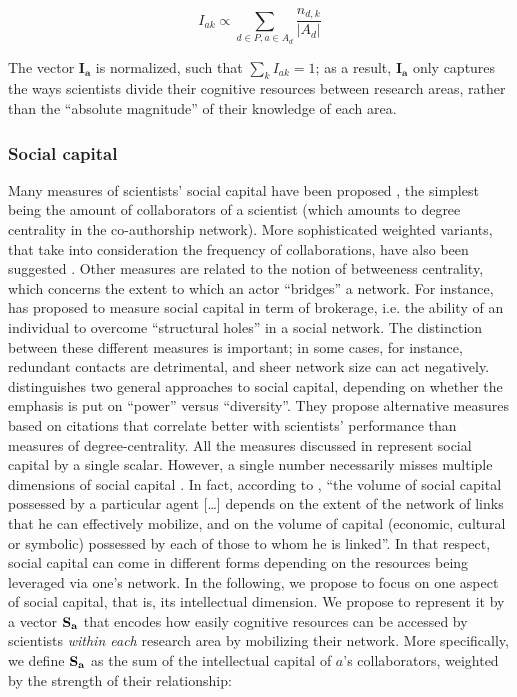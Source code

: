 \documentclass{article}
\begin{document}
\begin{equation}
    I_{ak} \propto  \sum_{d\in P,a\in A_d} \dfrac{n_{d,k}}{|A_d|}
\end{equation}

The vector $\bm{I_a}$ is normalized, such that $\sum_k I_{ak}=1$; as a result, $\bm{I_a}$ only captures the ways scientists divide their cognitive resources between research areas, rather than the ``absolute magnitude'' of their knowledge of each area.  

\subsubsection{Social capital}

Many measures of scientists' social capital have been proposed \citep{Abbasi2014,Schirone2023}, the simplest being the amount of collaborators of a scientist (which amounts to degree centrality in the co-authorship network). More sophisticated weighted variants, that take into consideration the frequency of collaborations, have also been suggested \citep{Abbasi2014}. Other measures are related to the notion of betweeness centrality, which concerns the extent to which an actor ``bridges'' a network. For instance, \citet{BurtBrokerage2007} has proposed to measure social capital in term of brokerage, i.e. the ability of an individual to overcome ``structural holes'' in a social network. The distinction between these different measures is important; in some cases, for instance, redundant contacts are detrimental, and sheer network size can act negatively. \citet{Abbasi2014} distinguishes two general approaches to social capital, depending on whether the emphasis is put on ``power'' versus ``diversity''. They propose alternative measures based on citations that correlate better with scientists' performance than measures of degree-centrality. All the measures discussed in \citealt{Abbasi2014} represent social capital by a single scalar. However, a single number necessarily misses multiple dimensions of social capital \citep{MartnAlczar2019}. In fact, according to \citet{Bourdieu1980}, ``the volume of social capital possessed by a particular agent [\dots] depends on the extent of the network of links that he can effectively mobilize, and on the volume of capital (economic, cultural or symbolic) possessed by each of those to whom he is linked''. In that respect, social capital can come in different forms depending on the resources being leveraged via one's network. %
In the following, we propose to focus on one aspect of social capital, that is, its intellectual dimension. We propose to represent it by a vector $\bf{S}_{a}$ that encodes how easily cognitive resources can be accessed by scientists \textit{within each} research area by mobilizing their network. %
More specifically, we define $\bf{S}_{a}$ as the sum of the intellectual capital of $a$'s collaborators, weighted by the strength of their relationship:
\end{document}
